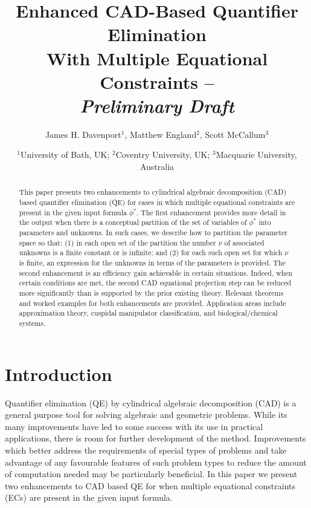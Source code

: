 \documentclass{article}
\begin{document}
\def\r{$\rightarrow$}\noindent

\author{James H. Davenport$^{1}$, Matthew England$^{2}$, Scott McCallum$^3$%
        }
\title{Enhanced CAD-Based Quantifier Elimination\\
       With Multiple Equational Constraints --\\
       \textbf{\textit{Preliminary Draft}}}  
\date{\small $^1$University of Bath, UK; $^2$Coventry University, UK; $^3$Macquarie University, Australia}

\maketitle

\begin{abstract}
This paper presents two enhancements to cylindrical algebraic decomposition (CAD) based quantifier elimination (QE) for cases in which multiple equational constraints are present in the given input formula $\phi^*$. The first enhancement provides more detail in the output when there is a conceptual partition of the set of variables of $\phi^*$ into parameters and unknowns. In such cases, we describe how to partition the parameter space so that: (1) in each open set of the partition the number $\nu$ of associated unknowns is a finite constant or is infinite; and (2) for each such open set for which $\nu$ is finite, an expression for the unknowns in terms of the parameters is provided. The second enhancement is an efficiency gain achievable in certain situations. Indeed, when certain conditions are met, the second CAD equational projection step can be reduced more significantly than is supported by the prior existing theory. Relevant theorems and worked examples for both enhancements are provided. Application areas include approximation theory, cuspidal manipulator classification, and biological/chemical systems.
\end{abstract}

\section{Introduction}
Quantifier elimination (QE) by cylindrical algebraic decomposition (CAD) is a general purpose tool for solving algebraic and geometric problems. While its many improvements have led to some success with its use in practical applications, there is room for further development of the method. Improvements which better address the requirements of special types of problems and take advantage of any favourable features of such problem types to reduce the amount of computation needed may be particularly beneficial. In this paper we present two enhancements to CAD based QE for when multiple equational constraints (ECs) are present in the given input formula. 
\end{document}
